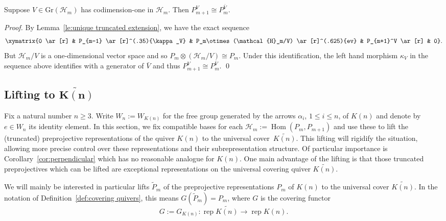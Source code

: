 \documentclass[smallextended,envcountsect,envcountsame]{svjour3}
\numberwithin{equation}{section}
\newcommand{\cH}{\mathcal{H}}
\newcommand{\Gr}{\mathrm{Gr}}
\newcommand{\Hom}{\operatorname{Hom}}
\newcommand{\rep}{\operatorname{rep}}
\begin{document}
\begin{corollary}
  \label{cor:truncated preprojective isomorphism}
  Suppose $V\in \Gr(\cH_m)$ has codimension-one in $\cH_m$.  Then $P_{m+1}^V\cong P_m^{\bar{V}}$.
\end{corollary}
\begin{proof}
  By Lemma~\ref{le:unique truncated extension}, we have the exact sequence
  \[\xymatrix{0 \ar[r] & P_{m-1} \ar[r]^(.35){\kappa_V} & P_m\otimes(\cH_m/V) \ar[r]^(.625){ev} & P_{m+1}^V \ar[r] & 0}.\]
  But $\cH_m/V$ is a one-dimensional vector space and so $P_m\otimes(\cH_m/V)\cong P_m$.
  Under this identification, the left hand morphism $\kappa_V$ in the sequence above identifies with a generator of $\bar{V}$ and thus $P_{m+1}^V\cong P_m^{\bar{V}}$.
\qed\end{proof}


\subsection{Lifting to \texorpdfstring{$\mathbf{\widetilde{K(n)}}$}{K(n)}}
\label{Lifting}

Fix a natural number $n\geq 3$.
Write $W_n:=W_{K(n)}$ for the free group generated by the arrows $\alpha_i$, $1\le i\le n$, of $K(n)$ and denote by $e\in W_n$ its identity element.
In this section, we fix compatible bases for each $\cH_m:=\Hom(P_m,P_{m+1})$ and use these to lift the (truncated) preprojective representations of the quiver $K(n)$ to the universal cover~$\widetilde{K(n)}$.
This lifting will rigidify the situation, allowing more precise control over these representations and their subrepresentation structure.
Of particular importance is Corollary~\ref{cor:perpendicular} which has no reasonable analogue for $K(n)$.
One main advantage of the lifting is that those truncated preprojectives which can be lifted are exceptional representations on the universal covering quiver $\widetilde{K(n)}$.

We will mainly be interested in particular lifts $\tilde P_m$ of the preprojective representations $P_m$ of $K(n)$ to the universal cover $\widetilde{K(n)}$.
In the notation of Definition~\ref{def:covering quivers}, this means $G(\tilde P_m)=P_m$, where $G$ is the covering functor 
\[G:=G_{K(n)}:\rep\widetilde{K(n)}\to\rep K(n).\]
\end{document}
